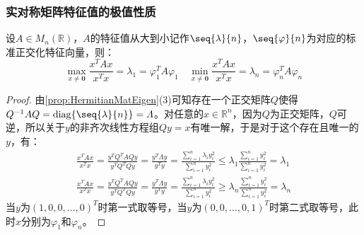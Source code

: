 \subsubsection{实对称矩阵特征值的极值性质}
\begin{theorem}\label{theo:maxminxAx/xx}
	设$A\in M_{n}(\mathbb{R})$，$A$的特征值从大到小记作$\seq{\lambda}{n}$，$\seq{\varphi}{n}$为对应的标准正交化特征向量，则：
	\begin{equation*}
		\max_{x\ne\mathbf{0}}\frac{x^TAx}{x^Tx}=\lambda_1=\varphi_1^TA\varphi_1\quad
		\min_{x\ne\mathbf{0}}\frac{x^TAx}{x^Tx}=\lambda_n=\varphi_n^TA\varphi_n
	\end{equation*}
\end{theorem} 
\begin{proof}
	由\cref{prop:HermitianMatEigen}(3)可知存在一个正交矩阵$Q$使得$Q^{-1}AQ=\operatorname{diag}\{\seq{\lambda}{n}\}=\varLambda$。对任意的$x\in\mathbb{R}^{n}$，因为$Q$为正交矩阵，$Q$可逆，所以关于$y$的非齐次线性方程组$Qy=x$有唯一解，于是对于这个存在且唯一的$y$，有：
	\begin{gather*}
		\frac{x^TAx}{x^Tx}=\frac{y^TQ^TAQy}{y^TQ^TQy}=\frac{y^T\varLambda y}{y^Ty}=\frac{\sum\limits_{i=1}^{n}\lambda_iy_i^2}{\sum\limits_{i=1}^ny_i^2}\leqslant\lambda_1\frac{\sum\limits_{i=1}^{n}y_i^2}{\sum\limits_{i=1}^ny_i^2}=\lambda_1 \\
		\frac{x^TAx}{x^Tx}=\frac{y^TQ^TAQy}{y^TQ^TQy}=\frac{y^T\varLambda y}{y^Ty}=\frac{\sum\limits_{i=1}^{n}\lambda_iy_i^2}{\sum\limits_{i=1}^ny_i^2}\geqslant\lambda_n\frac{\sum\limits_{i=1}^{n}y_i^2}{\sum\limits_{i=1}^ny_i^2}=\lambda_n
	\end{gather*}
	当$y$为$(1,0,0,\dots,0)^T$时第一式取等号，当$y$为$(0,0,\dots,0,1)^T$时第二式取等号，此时$x$分别为$\varphi_1$和$\varphi_n$。
\end{proof}
